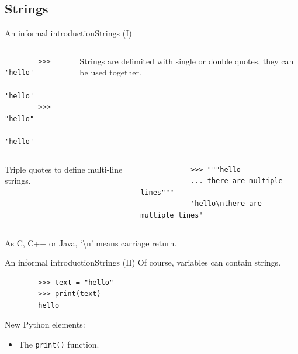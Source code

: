 \documentclass[10pt,compress]{beamer} %
\begin{document}
\subsection{Strings}
\begin{frame}[fragile]{An informal introduction}{Strings (I)}
   	\begin{columns}
		\begin{block}{}
		\begin{verbatim}
		>>> 'hello'
		'hello'
		>>> "hello"
		'hello'
		\end{verbatim}
		\end{block}

		Strings are delimited with single or double quotes, they can be used together.
	\end{columns}

   	\begin{columns}
			Triple quotes to define multi-line strings.

		\begin{block}{}
			\begin{verbatim}
			>>> """hello
			... there are multiple lines"""
			'hello\nthere are multiple lines'
			\end{verbatim}
			\end{block}
	\end{columns}
	\bigskip
	As C, C++ or Java, `\textbackslash n' means carriage return.
\end{frame}

\begin{frame}[fragile]{An informal introduction}{Strings (II)}
	Of course, variables can contain strings.
	\begin{block}{}
		\begin{verbatim}
		>>> text = "hello"
		>>> print(text)
		hello
		\end{verbatim}
	\end{block}

    New Python elements:
    \begin{itemize}
        \item The \texttt{print()} function.
    \end{itemize}
\end{frame}
\end{document}
